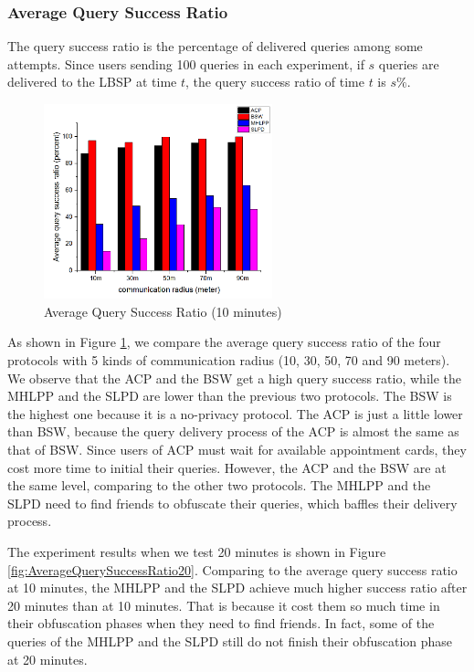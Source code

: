 \documentclass[conference]{IEEEtran}
\begin{document}
\subsubsection{  Average Query Success Ratio}

The query success ratio is the percentage of delivered queries among some attempts. Since users sending 100 queries in each experiment, if $s$ queries are delivered to the LBSP at time $t$, the query success ratio of time $t$ is $s\%$.

\begin{figure} [H]
  \centering 
  \includegraphics[width=2.6in]{figures/F414AverageQuerySuccessRatio10minutes.png}
  \caption{Average Query Success Ratio (10 minutes)} 
  \label{fig:AverageQuerySuccessRatio10} %
\end{figure}

As shown in Figure \ref{fig:AverageQuerySuccessRatio10}, we compare the average query success ratio of the four protocols with 5 kinds of communication radius (10, 30, 50, 70 and 90 meters). We observe that the ACP and the BSW get a high query success ratio, while the MHLPP and the SLPD are lower than the previous two protocols. The BSW is the highest one because it is a no-privacy protocol. The ACP is just a little lower than BSW, because the query delivery process of the ACP is almost the same as that of BSW. Since users of ACP must wait for available appointment cards, they cost more time to initial their queries. However, the ACP and the BSW are at the same level, comparing to the other two protocols. The MHLPP and the SLPD need to find friends to obfuscate their queries, which baffles their delivery process.


The experiment results when we test 20 minutes is shown in Figure \ref{fig:AverageQuerySuccessRatio20}. Comparing to the average query success ratio at 10 minutes, the MHLPP and the SLPD achieve much higher success ratio after 20 minutes than at 10 minutes. That is because it cost them so much time in their obfuscation phases when they need to find friends. In fact, some of the queries of the MHLPP and the SLPD still do not finish their obfuscation phase at 20 minutes.
\end{document}
